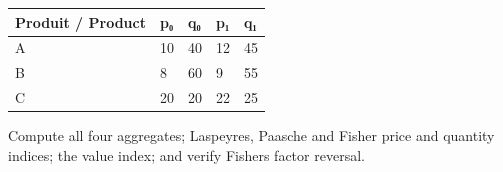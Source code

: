 \documentclass[11pt,a4paper]{article}
\begin{document}
\begin{longtable}[]{@{}lllll@{}}
\toprule\noalign{}
Produit / Product & p₀ & q₀ & p₁ & q₁ \\
\midrule\noalign{}
\endhead
\bottomrule\noalign{}
\endlastfoot
A & 10 & 40 & 12 & 45 \\
B & 8 & 60 & 9 & 55 \\
C & 20 & 20 & 22 & 25 \\
\end{longtable}

Compute all four aggregates; Laspeyres, Paasche and Fisher price and quantity indices; the value index; and verify Fisher\textquotesingle s factor reversal.
\end{document}
